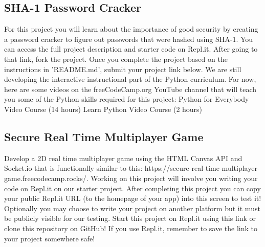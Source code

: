 \documentclass{article}%
\begin{document}
\subsection{SHA{-}1 Password Cracker}%
\label{subsec:SHA{-}1PasswordCracker}%
For this project you will learn about the importance of good security by creating a password cracker to figure out passwords that were hashed using SHA{-}1.\newline%
You can access the full project description and starter code on Repl.it.\newline%
After going to that link, fork the project. Once you complete the project based on the instructions in 'README.md', submit your project link below.\newline%
We are still developing the interactive instructional part of the Python curriculum. For now, here are some videos on the freeCodeCamp.org YouTube channel that will teach you some of the Python skills required for this project:\newline%
Python for Everybody Video Course (14 hours)\newline%
  \newline%
Learn Python Video Course (2 hours)\newline%
  \newline%

%
\subsection{Secure Real Time Multiplayer Game}%
\label{subsec:SecureRealTimeMultiplayerGame}%
Develop a 2D real time multiplayer game using the HTML Canvas API and Socket.io that is functionally similar to this: https://secure{-}real{-}time{-}multiplayer{-}game.freecodecamp.rocks/.\newline%
Working on this project will involve you writing your code on Repl.it on our starter project. After completing this project you can copy your public Repl.it URL (to the homepage of your app) into this screen to test it! Optionally you may choose to write your project on another platform but it must be publicly visible for our testing.\newline%
Start this project on Repl.it using this link or clone this repository on GitHub! If you use Repl.it, remember to save the link to your project somewhere safe!\newline%

%
\newpage%
\end{document}
